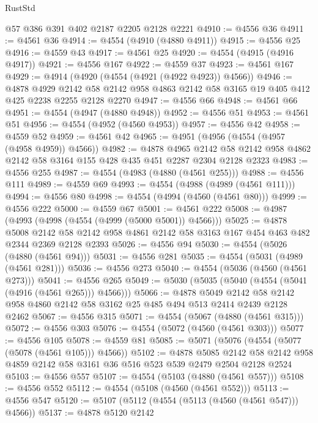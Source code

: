 \begin{lexlean}{RustStd}
\begin{coremodule}
    @57
    @386
    @391
    @402
    @2187
    @2205
    @2128
    @2221
@4910 := @4556 @36
@4911 := @4561 @36
@4914 := @4554 (@4910 (@4880 @4911))
@4915 := @4556 @25
@4916 := @4559 @43
@4917 := @4561 @25
@4920 := @4554 (@4915 (@4916 @4917))
@4921 := @4556 @167
@4922 := @4559 @37
@4923 := @4561 @167
@4929 := @4914 (@4920 (@4554 (@4921 (@4922 @4923)) @4566))
@4946 := @4878
    @4929
    @2142
    @58
    @2142
    @958
    @4863
    @2142
    @58
    @3165
    @19
    @405
    @412
    @425
    @2238
    @2255
    @2128
    @2270
@4947 := @4556 @66
@4948 := @4561 @66
@4951 := @4554 (@4947 (@4880 @4948))
@4952 := @4556 @51
@4953 := @4561 @51
@4956 := @4554 (@4952 (@4560 @4953))
@4957 := @4556 @42
@4958 := @4559 @52
@4959 := @4561 @42
@4965 := @4951 (@4956 (@4554 (@4957 (@4958 @4959)) @4566))
@4982 := @4878
    @4965
    @2142
    @58
    @2142
    @958
    @4862
    @2142
    @58
    @3164
    @155
    @428
    @435
    @451
    @2287
    @2304
    @2128
    @2323
@4983 := @4556 @255
@4987 := @4554 (@4983 (@4880 (@4561 @255)))
@4988 := @4556 @111
@4989 := @4559 @69
@4993 := @4554 (@4988 (@4989 (@4561 @111)))
@4994 := @4556 @80
@4998 := @4554 (@4994 (@4560 (@4561 @80)))
@4999 := @4556 @222
@5000 := @4559 @67
@5001 := @4561 @222
@5008 := @4987 (@4993 (@4998 (@4554 (@4999 (@5000 @5001)) @4566)))
@5025 := @4878
    @5008
    @2142
    @58
    @2142
    @958
    @4861
    @2142
    @58
    @3163
    @167
    @454
    @463
    @482
    @2344
    @2369
    @2128
    @2393
@5026 := @4556 @94
@5030 := @4554 (@5026 (@4880 (@4561 @94)))
@5031 := @4556 @281
@5035 := @4554 (@5031 (@4989 (@4561 @281)))
@5036 := @4556 @273
@5040 := @4554 (@5036 (@4560 (@4561 @273)))
@5041 := @4556 @265
@5049 := @5030 (@5035 (@5040 (@4554 (@5041 (@4916 (@4561 @265))) @4566)))
@5066 := @4878
    @5049
    @2142
    @58
    @2142
    @958
    @4860
    @2142
    @58
    @3162
    @25
    @485
    @494
    @513
    @2414
    @2439
    @2128
    @2462
@5067 := @4556 @315
@5071 := @4554 (@5067 (@4880 (@4561 @315)))
@5072 := @4556 @303
@5076 := @4554 (@5072 (@4560 (@4561 @303)))
@5077 := @4556 @105
@5078 := @4559 @81
@5085 := @5071 (@5076 (@4554 (@5077 (@5078 (@4561 @105))) @4566))
@5102 := @4878
    @5085
    @2142
    @58
    @2142
    @958
    @4859
    @2142
    @58
    @3161
    @36
    @516
    @523
    @539
    @2479
    @2504
    @2128
    @2524
@5103 := @4556 @557
@5107 := @4554 (@5103 (@4880 (@4561 @557)))
@5108 := @4556 @552
@5112 := @4554 (@5108 (@4560 (@4561 @552)))
@5113 := @4556 @547
@5120 := @5107 (@5112 (@4554 (@5113 (@4560 (@4561 @547))) @4566))
@5137 := @4878
    @5120
    @2142

\end{coremodule}
\end{lexlean}
